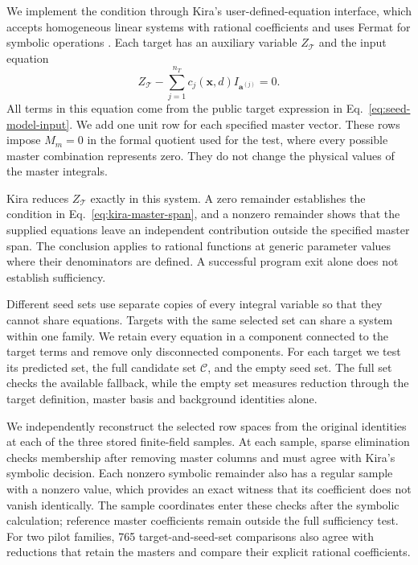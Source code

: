 We implement the condition through Kira's user-defined-equation
interface, which accepts homogeneous linear systems with rational
coefficients and uses Fermat for symbolic operations
\cite{Kira12,Kira3}. Each target has an auxiliary variable
$Z_{\mathcal T}$ and the input equation
\begin{equation}
 Z_{\mathcal T}
 -\sum_{j=1}^{n_T}c_j(\boldsymbol x,d)
                         I_{\boldsymbol a^{(j)}}=0.
 \label{eq:kira-target-definition}
\end{equation}
All terms in this equation come from the public target expression
in Eq.~\eqref{eq:seed-model-input}. We add one unit row for each
specified master vector. These rows impose $M_m=0$ in the formal
quotient used for the test, where every possible master combination
represents zero. They do not change the physical values of the
master integrals.

Kira reduces $Z_{\mathcal T}$ exactly in this system. A zero remainder
establishes the condition in Eq.~\eqref{eq:kira-master-span}, and a
nonzero remainder shows that the supplied equations leave an
independent contribution outside the specified master span.
The conclusion applies to rational functions at generic parameter
values where their denominators are defined. A successful program
exit alone does not establish sufficiency.

Different seed sets use separate copies of every integral variable
so that they cannot share equations. Targets with the same selected
set can share a system within one family. We retain every equation
in a component connected to the target terms and remove only
disconnected components. For each target we test its predicted set,
the full candidate set $\mathcal C$, and the empty seed set.
The full set checks the available fallback, while the empty set
measures reduction through the target definition, master basis and
background identities alone.

We independently reconstruct the selected row spaces from the
original identities at each of the three stored finite-field
samples. At each sample, sparse elimination checks membership after
removing master columns and must agree with Kira's symbolic decision.
Each nonzero symbolic remainder also has a regular sample with a
nonzero value, which provides an exact witness that its coefficient
does not vanish identically. The sample coordinates enter these
checks after the symbolic calculation; reference master coefficients
remain outside the full sufficiency test. For two pilot
families, 765 target-and-seed-set comparisons also agree with
reductions that retain the masters and compare their explicit
rational coefficients.

